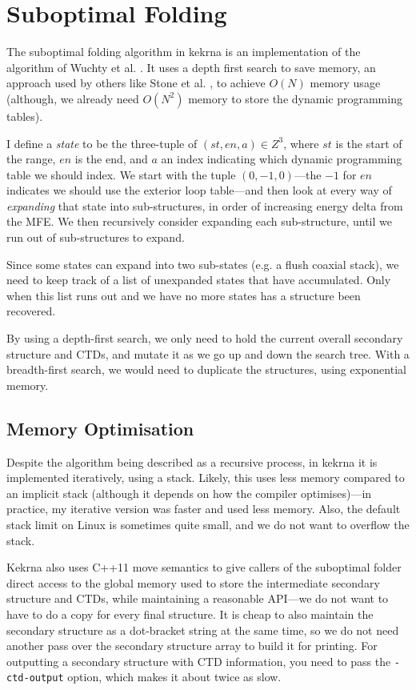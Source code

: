 \documentclass{cshonours}
\begin{document}
\section{Suboptimal Folding}
The suboptimal folding algorithm in kekrna is an implementation of the algorithm of Wuchty et al. \cite{wuchtySuboptimal}. It uses a depth first search to save memory, an approach used by others like Stone et al. \cite{stoneWuchty}, to achieve $O(N)$ memory usage (although, we already need $O(N^2)$ memory to store the dynamic programming tables). 

I define a \emph{state} to be the three-tuple of $(st, en, a) \in Z^3$, where $st$ is the start of the range, $en$ is the end, and $a$ an index indicating which dynamic programming table we should index. We start with the tuple $(0, -1, 0)$---the $-1$ for $en$ indicates we should use the exterior loop table---and then look at every way of \emph{expanding} that state into sub-structures, in order of increasing energy delta from the MFE. We then recursively consider expanding each sub-structure, until we run out of sub-structures to expand.

Since some states can expand into two sub-states (e.g. a flush coaxial stack), we need to keep track of a list of unexpanded states that have accumulated. Only when this list runs out and we have no more states has a structure been recovered.

By using a depth-first search, we only need to hold the current overall secondary structure and CTDs, and mutate it as we go up and down the search tree. With a breadth-first search, we would need to duplicate the structures, using exponential memory.

\subsection{Memory Optimisation}
Despite the algorithm being described as a recursive process, in kekrna it is implemented iteratively, using a stack. Likely, this uses less memory compared to an implicit stack (although it depends on how the compiler optimises)---in practice, my iterative version was faster and used less memory. Also, the default stack limit on Linux is sometimes quite small, and we do not want to overflow the stack.

Kekrna also uses C++11 move semantics to give callers of the suboptimal folder direct access to the global memory used to store the intermediate secondary structure and CTDs, while maintaining a reasonable API---we do not want to have to do a copy for every final structure. It is cheap to also maintain the secondary structure as a dot-bracket string at the same time, so we do not need another pass over the secondary structure array to build it for printing. For outputting a secondary structure with CTD information, you need to pass the \texttt{-ctd-output} option, which makes it about twice as slow.
\end{document}
